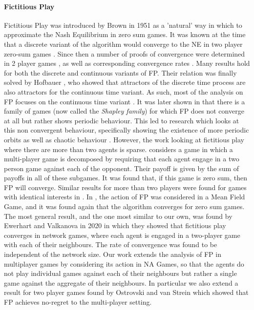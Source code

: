 \documentclass{article}
\theoremstyle{definition}
\begin{document}
\paragraph{Fictitious Play}

Fictitious Play was introduced by Brown in 1951 \cite{BrownPublished, BrownUnpublished} as a
'natural' way in which to approximate the Nash Equilibrium in zero sum games. It was known at the
time that a discrete variant of the algorithm would converge to the NE in two player zero-sum games
\cite{Robinson}. Since then a number of proofs of convergence were determined in 2 player games
\cite{Miyasawa, Polak, Berger, Monderer and Sela, Monderer and Shapley}, as well as corresponding
convergence rates \cite{Harris, Shapiro}. Many results hold for both the discrete and continuous
variants of FP. Their relation was finally solved by Hofbauer \cite{Hofbauer}, who showed that
attractors of the discrete time process are also attractors for the continuous time variant. As
such, most of the analysis on FP focuses on the continuous time variant \cite{Ostrovski}. It was
later shown in \cite{Shapley} that there is a family of games (now called the \emph{Shapley family})
for which FP does not converge at all but rather shows periodic behaviour. This led to research
which looks at this non convergent behaviour, specifically showing the existence of more periodic
orbits as well as chaotic behaviour \cite{Sparrow}. However, the work looking at fictitious play
where there are more than two agents is sparse. \cite{Sela} considers a game in which a multi-player
game is decomposed by requiring that each agent engage in a two person game against each of the
opponent. Their payoff is given by the sum of payoffs in all of these subgames. It was found that,
if this game is zero sum, then FP will converge. Similar results for more than two players were
found for games with identical interests in \cite{MondererShapley1994}. In \cite{FPMFG}, the action
of FP was considered in a Mean Field Game, and it was found again that the algorithm converges for
zero sum games. The most general result, and the one most similar to our own, was found by Ewerhart
and Valkanova in 2020 \cite{Ewerhart} in which they showed that fictitious play converges in network
games, where each agent is engaged in a two-player game with each of their neighbours. The rate of
convergence was found to be independent of the network size.  Our work extends the analysis of FP in
multiplayer games by considering its action in NA Games, so that the agents do not play individual
games against each of their neighbours but rather a single game against the aggregate of their
neighbours. In particular we also extend a result for two player games found by Ostrovski and van
Strein \cite{Payoff Performance} which showed that FP achieves no-regret to the multi-player
setting.
\end{document}
